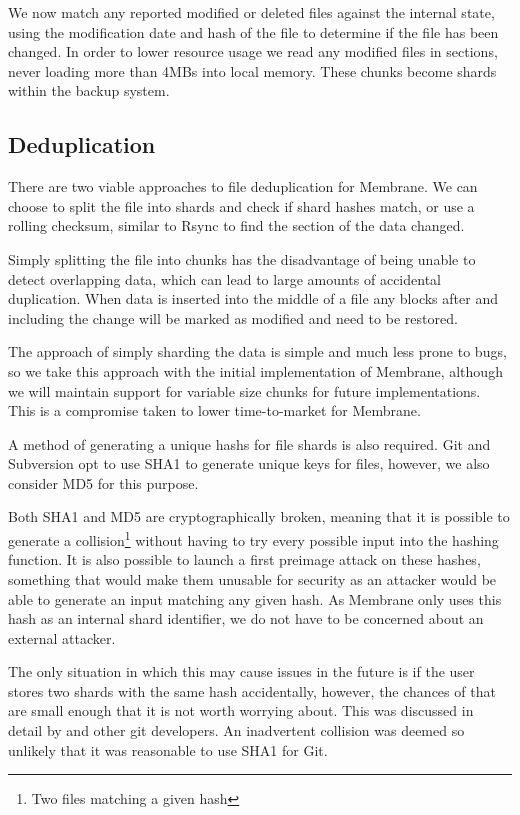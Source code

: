 \documentclass[11pt, a4paper, twocolumn, twoside]{report}
\begin{document}
We now match any reported modified or deleted files against the internal state, using the modification date and hash of the file to determine if the file has been changed. In order to lower resource usage we read any modified files in sections, never loading more than 4MBs into local memory. These chunks become shards within the backup system.

\subsection{Deduplication}

There are two viable approaches to file deduplication for Membrane. We can choose to split the file into shards and check if shard hashes match, or use a rolling checksum, similar to Rsync to find the section of the data changed. \citep{tridgell1996rsync}

Simply splitting the file into chunks has the disadvantage of being unable to detect overlapping data, which can lead to large amounts of accidental duplication. When data is inserted into the middle of a file any blocks after and including the change will be marked as modified and need to be restored.

The approach of simply sharding the data is simple and much less prone to bugs, so we take this approach with the initial implementation of Membrane, although we will maintain support for variable size chunks for future implementations. This is a compromise taken to lower time-to-market for Membrane.

A method of generating a unique hashs for file shards is also required. Git and Subversion opt to use SHA1 \citep{torvalds2010git} to generate unique keys for files, however, we also consider MD5 for this purpose.

Both SHA1 \citep{wang2005collision} and MD5 \citep{stevens2006fast} are cryptographically broken, meaning that it is possible to generate a collision\footnote{Two files matching a given hash} without having to try every possible input into the hashing function. It is also possible to launch a first preimage attack on these hashes, something that would make them unusable for security as an attacker would be able to generate an input matching any given hash. As Membrane only uses this hash as an internal shard identifier, we do not have to be concerned about an external attacker.

The only situation in which this may cause issues in the future is if the user stores two shards with the same hash accidentally, however, the chances of that are small enough that it is not worth worrying about. This was discussed in detail by \cite{torvalds2006gitcollisions} and other git developers. An inadvertent collision was deemed so unlikely that it was reasonable to use SHA1 for Git.
\end{document}
